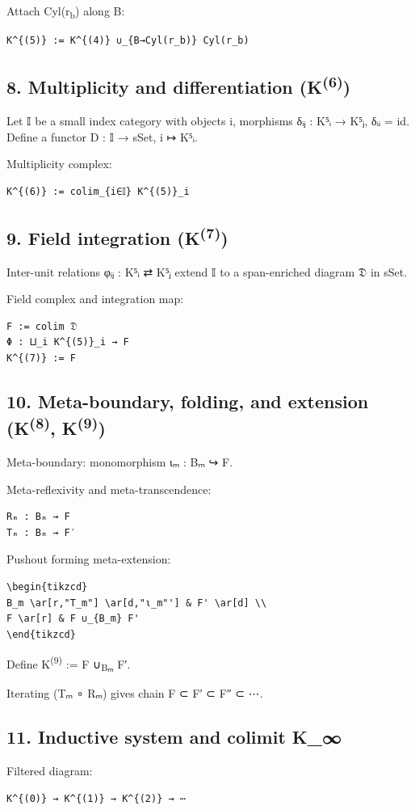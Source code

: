 \documentclass[11pt]{article}
\begin{document}
Attach Cyl(r\textsubscript{b}) along B:

\begin{verbatim}
K^{(5)} := K^{(4)} ∪_{B→Cyl(r_b)} Cyl(r_b)
\end{verbatim}
\subsection*{8. Multiplicity and differentiation (K\textsuperscript{(6)})}
\label{sec:org26e6db0}
Let 𝕀 be a small index category with objects i, morphisms δᵢⱼ : K⁵ᵢ → K⁵ⱼ, δᵢᵢ = id.
Define a functor D : 𝕀 → sSet,  i ↦ K⁵ᵢ.

Multiplicity complex:
\begin{verbatim}
K^{(6)} := colim_{i∈𝕀} K^{(5)}_i
\end{verbatim}
\subsection*{9. Field integration (K\textsuperscript{(7)})}
\label{sec:orgf2f0996}
Inter-unit relations φᵢⱼ : K⁵ᵢ ⇄ K⁵ⱼ extend 𝕀 to a span-enriched diagram 𝔇 in sSet.

Field complex and integration map:
\begin{verbatim}
F := colim 𝔇
Φ : ⨿_i K^{(5)}_i → F
K^{(7)} := F
\end{verbatim}
\subsection*{10. Meta-boundary, folding, and extension (K\textsuperscript{(8)}, K\textsuperscript{(9)})}
\label{sec:org12ca133}
Meta-boundary: monomorphism ιₘ : Bₘ ↪ F.

Meta-reflexivity and meta-transcendence:
\begin{verbatim}
Rₘ : Bₘ → F
Tₘ : Bₘ → F′
\end{verbatim}

Pushout forming meta-extension:
\begin{verbatim}
\begin{tikzcd}
B_m \ar[r,"T_m"] \ar[d,"ι_m"'] & F' \ar[d] \\
F \ar[r] & F ∪_{B_m} F'
\end{tikzcd}
\end{verbatim}

Define K\textsuperscript{(9)} := F ∪\textsubscript{Bₘ} F′.

Iterating (Tₘ ∘ Rₘ) gives chain F ⊂ F′ ⊂ F″ ⊂ ⋯.
\subsection*{11. Inductive system and colimit K\_∞}
\label{sec:orgddcf13e}
Filtered diagram:
\begin{verbatim}
K^{(0)} → K^{(1)} → K^{(2)} → ⋯
\end{verbatim}
\end{document}

